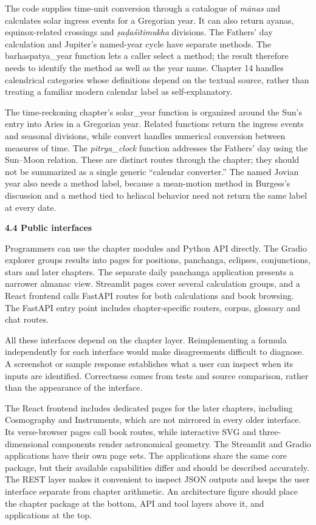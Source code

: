 \documentclass[
]{article}
\begin{document}
The code supplies time-unit conversion through a catalogue of
\emph{mānas} and calculates solar ingress events for a Gregorian year.
It can also return ayanas, equinox-related crossings and
\emph{ṣaḍaśītimukha} divisions. The Fathers' day calculation and
Jupiter's named-year cycle have separate methods. The barhaspatya\_year
function lets a caller select a method; the result therefore needs to
identify the method as well as the year name. Chapter 14 handles
calendrical categories whose definitions depend on the textual source,
rather than treating a familiar modern calendar label as
self-explanatory.

The time-reckoning chapter's solar\_year function is organized around
the Sun's entry into Aries in a Gregorian year. Related functions return
the ingress events and seasonal divisions, while convert handles
numerical conversion between measures of time. The \emph{pitrya\_clock}
function addresses the Fathers' day using the Sun--Moon relation. These
are distinct routes through the chapter; they should not be summarized
as a single generic ``calendar converter.'' The named Jovian year also
needs a method label, because a mean-motion method in Burgess's
discussion and a method tied to heliacal behavior need not return the
same label at every date.

\textbf{4.4 Public interfaces}

Programmers can use the chapter modules and Python API directly. The
Gradio explorer groups results into pages for positions, panchanga,
eclipses, conjunctions, stars and later chapters. The separate daily
panchanga application presents a narrower almanac view. Streamlit pages
cover several calculation groups, and a React frontend calls FastAPI
routes for both calculations and book browsing. The FastAPI entry point
includes chapter-specific routers, corpus, glossary and chat routes.

All these interfaces depend on the chapter layer. Reimplementing a
formula independently for each interface would make disagreements
difficult to diagnose. A screenshot or sample response establishes what
a user can inspect when its inputs are identified. Correctness comes
from tests and source comparison, rather than the appearance of the
interface.

The React frontend includes dedicated pages for the later chapters,
including Cosmography and Instruments, which are not mirrored in every
older interface. Its verse-browser pages call book routes, while
interactive SVG and three-dimensional components render astronomical
geometry. The Streamlit and Gradio applications have their own page
sets. The applications share the same core package, but their available
capabilities differ and should be described accurately. The REST layer
makes it convenient to inspect JSON outputs and keeps the user interface
separate from chapter arithmetic. An architecture figure should place
the chapter package at the bottom, API and tool layers above it, and
applications at the top.
\end{document}
